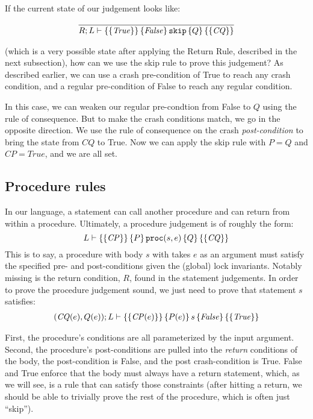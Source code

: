 If the current state of our judgement looks like:

\begin{gather*}
\infer{\hoarestmt{R}{L}{\mathit{True}}{\mathit{False}}{\texttt{skip}}{Q}{\mathit{CQ}}}{}
\end{gather*}

(which is a very possible state after applying the Return Rule, described in the
next subsection), how can we use the skip rule to prove this judgement? As
described earlier, we can use a crash pre-condition of True to reach any crash
condition, and a regular pre-condition of False to reach any regular condition.

In this case, we can weaken our regular pre-condtion from False to $Q$
using the rule of consequence.
But to make the crash conditions match, we go in
the opposite direction.
We use the rule of consequence on the crash
\textit{post-condition} to bring the state from $\mathit{CQ}$ to True.
Now we can apply
the skip rule with $P=Q$ and $\mathit{CP}=True$, and we are all set.

\subsection{Procedure rules}
\label{sec:procrules}

In our language, a statement can call another procedure and can return from
within a procedure.
Ultimately, a procedure judgement is of roughly the form:
$$L \vdash \left\{\left\{ \mathit{CP} \right\}\right\} \left\{ P \right\} \texttt{proc}(s, e) \left\{ Q \right\} \left\{\left\{ \mathit{CQ} \right\}\right\}$$
This is to say, a procedure with body $s$ with takes $e$ as an argument must
satisfy the specified pre- and post-conditions given the (global) lock
invariants.
Notably missing is the return condition, $R$, found in the statement
judgements.
In order to prove the procedure judgement sound, we just need to
prove that statement $s$ satisfies:
\begin{gather*}
(\mathit{CQ}(e),Q(e)); L \vdash \left\{\left\{ \mathit{CP}(e) \right\}\right\} \left\{ P(e) \right\} s \left\{ \mathit{False} \right\} \left\{\left\{ \mathit{True} \right\}\right\}
\end{gather*}

First, the procedure's conditions are all parameterized by the input argument.
Second, the procedure's post-conditions are pulled into the \textit{return}
conditions of the body, the post-condition is False, and the post
crash-condition is True.
False and True enforce that the body must always have a
return statement, which, as we will see, is a rule that can satisfy those
constraints (after hitting a return, we should be able to trivially prove the
rest of the procedure, which is often just ``skip'').

